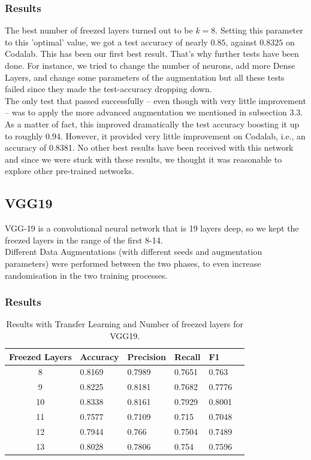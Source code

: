 \documentclass[10pt]{article}
\begin{document}
\subsubsection{Results}
The best number of freezed layers turned out to be $k=8$. Setting this parameter to this 'optimal' value, we got a test accuracy of nearly $0.85$, against $0.8325$ on Codalab. This has been our first best result. That's why further tests have been done. For instance, we tried to change the number of neurons, add more Dense Layers, and change some parameters of the augmentation but all these tests failed since they made the test-accuracy dropping down.\\[0.1cm]
The only test that passed successfully -- even though with very little improvement -- was to apply the more advanced augmentation we mentioned in subsection 3.3. As a matter of fact, this improved dramatically the test accuracy boosting it up to roughly 0.94. However, it provided very little improvement on Codalab, i.e., an accuracy of 0.8381. No other best results have been received with this network and since we were stuck with these results, we thought it was reasonable to explore other pre-trained networks.
\subsection{VGG19}
VGG-19 is a convolutional neural network that is 19 layers deep, so we kept the freezed layers in the range of the first 8-14.\\
Different Data Augmentations (with different seeds and augmentation parameters) were performed between the two phases,
to even increase randomisation in the two training processes.
\subsubsection{Results}
\begin{table}[ht]
\centering
\begin{adjustbox}{width=240}
\small
\begin{tabular}{|c|l|l|l|l|l}

\hline \bf Freezed Layers & \bf Accuracy & \bf Precision & \bf Recall & \bf F1 \\ \hline
8 & 0.8169 & 0.7989 & 0.7651 & 0.763\\
9 & 0.8225 & 0.8181 & 0.7682 & 0.7776\\
10 & 0.8338 & 0.8161 & 0.7929 & 0.8001\\
11 & 0.7577 & 0.7109 & 0.715 & 0.7048\\
12 & 0.7944 & 0.766 & 0.7504 & 0.7489\\
13 & 0.8028 & 0.7806 & 0.754 & 0.7596\\
\hline
\end{tabular}
\end{adjustbox}
\caption{Results with Transfer Learning and Number of freezed layers for VGG19.}
\end{table}
\end{document}
